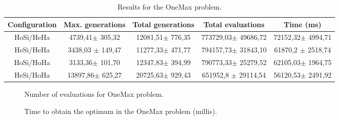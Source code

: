 \documentclass{sig-alternate}
\begin{document}
\begin{table*}
\centering
\caption{Results for the OneMax problem.}
\begin{tabular}{|c|c|c|c|c|} \hline
Configuration	& Max. generations			& Total generations			& 	Total evaluations			& Time (ms) \\ \hline
HoSi/HeHa		& 4739,41$\pm$	305,32 		&	12081,51$\pm$	776,35 	&	773729,03$\pm$	49686,72 	&	72152,32$\pm$	4994,71 \\ \hline
HeSi/HeHa		&	3438,03 $\pm$	149,47 &	11277,33$\pm$	471,77 &	794157,73$\pm$	31843,10 	&	61870,2	$\pm$ 2518,74 \\ \hline
HoSi/HoHa		&	3133,36$\pm$	101,70 	&	12347,83$\pm$	394,99 	&	790773,33$\pm$	25279,52 	&	62105,03$\pm$	1964,75 \\ \hline
HeSi/HoHa		& 13897,86$\pm$	625,27 		&	20725,63$\pm$	929,43 	&	651952,8 $\pm$	29114,54	&	56120,53$\pm$	2491,92 \\ \hline
\end{tabular}
\label{tab:onemaxresults}
\end{table*}

\begin{figure}
\centering
{}
\caption{Number of evaluations for OneMax problem.}
\end{figure}

\begin{figure}
\centering
{}
\caption{Time to obtain the optimum in the OneMax problem (millis).}
\end{figure}
\end{document}
